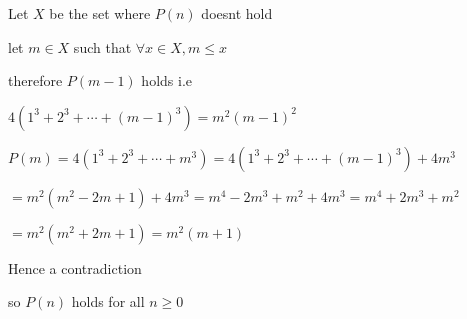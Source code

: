 Let $X$ be the set where $P(n)$ doesnt hold

let $m \in X$ such that $\forall x \in X, m \leq x$

therefore $P(m-1)$ holds i.e

$4(1^3 + 2^3 + \cdots + (m-1)^3) = m^2(m-1)^2$

$P(m) = 4(1^3 + 2^3 + \cdots + m^3) = 4(1^3 + 2^3 + \cdots + (m-1)^3) + 4m^3$

$= m^2(m^2 - 2m + 1) + 4m^3 = m^4 - 2m^3 + m^2 + 4m^3 = m^4 + 2m^3 + m^2$

$= m^2(m^2 + 2m + 1) = m^2(m + 1)$

Hence a contradiction

so $P(n)$ holds for all $n \geq 0$
